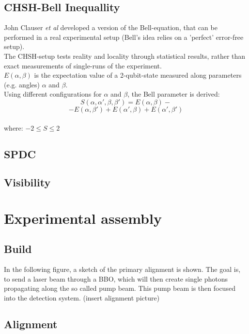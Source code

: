 \documentclass[12pt,a4paper]{article}
\begin{document}
\begin{multicols}{2}
\subsection{CHSH-Bell Inequallity}
John Clauser \textit{et al} developed a version of the Bell-equation, that can be performed in a real experimental setup (Bell's idea relies on a 'perfect' error-free setup).\\
The CHSH-setup tests reality and locality through statistical results, rather than exact measurements of single-runs of the experiment.\\
$E(\alpha, \beta)$ is the expectation value of a 2-qubit-state measured along parameters (e.g. angles) $\alpha$ and $\beta$.\\
Using different configurations for $\alpha$ and $\beta$, the Bell parameter is derived:
$$S(\alpha, \alpha', \beta, \beta') = E(\alpha, \beta) - $$
$$-E(\alpha, \beta') + E(\alpha', \beta) + E(\alpha', \beta')$$
\\
where:  $-2 \le S \le 2$

\subsection{SPDC}

\subsection{Visibility}


\section{Experimental assembly}

\subsection{Build}
In the following figure, a sketch of the primary alignment is shown. The goal is, to send a laser beam through a BBO, which will then create single photons propagating along the so called pump beam. This pump beam is then focused into the detection system.
(insert alignment picture)

\subsection{Alignment}


\end{multicols}
\end{document}
